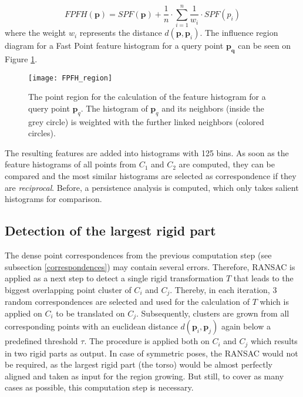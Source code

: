 \begin{equation}
FPFH(\boldsymbol{p}) = SPF(\boldsymbol{p}) + \frac{1}{n} \cdot \displaystyle\sum_{i=1}^{n}\frac{1}{w_i} \cdot SPF(p_i)
\end{equation}
where the weight $w_i$ represents the distance $d(\boldsymbol{p},\boldsymbol{p}_i)$. The influence region diagram for a Fast Point feature histogram for a query point $\boldsymbol{p_q}$ can be seen on Figure \ref{fig:FPFHregion}. 
\begin{figure}[H]
	\centering
	\texttt{[image: FPFH\_region]}
	\caption{The point region for the calculation of the feature histogram for a query point $\boldsymbol{p}_q$. The histogram of $\boldsymbol{p}_q$ and its neighbors (inside the grey circle) is weighted with the further linked neighbors (colored circles).}
	\label{fig:FPFHregion}
\end{figure}
The resulting features are added into histograms with 125 bins. As soon as the feature histograms of all points from $C_1$ and $C_2$ are computed, they can be compared and the most similar histograms are selected as correspondence if they are \textit{reciprocal}. Before, a persistence analysis is computed, which only takes salient histograms for comparison. 

\subsection{Detection of the largest rigid part}
\label{detectionLRP}
The dense point correspondences from the previous computation step (see subsection \ref{correspondences}) may contain several errors. Therefore, RANSAC is applied as a next step to detect a single rigid transformation $T$ that leads to the biggest overlapping point cluster of $C_i$ and $C_j$. Thereby, in each iteration, 3 random correspondences are selected and used for the calculation of $T$ which is applied on $C_i$ to be translated on $C_j$. Subsequently, clusters are grown from all corresponding points with an euclidean distance $d(\boldsymbol{p}_i,\boldsymbol{p}_j)$ again below a predefined threshold $\tau$. The procedure is applied both on $C_i$ and $C_j$ which results in two rigid parts as output. In case of symmetric poses, the RANSAC would not be required, as the largest rigid part (the torso) would be almost perfectly aligned and taken as input for the region growing. But still, to cover as many cases as possible, this computation step is necessary. 

